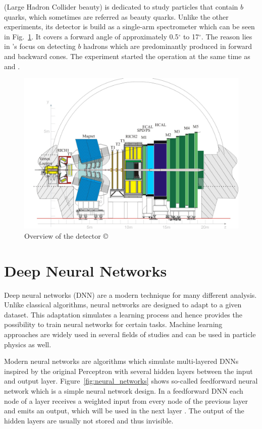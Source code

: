 \documentclass[bachelor,ngerman,english]{GAUBM}
\begin{document}
\lhcb (Large Hadron Collider beauty) \cite{other:lhcb} is dedicated to study particles that contain $b$ quarks, which sometimes are referred as beauty quarks. Unlike the other experiments, its detector is build as a single-arm spectrometer which can be seen in Fig.~\ref{fig:detector_lhcb}. It covers a forward angle of approximately 0.5$^\circ$ to 17$^\circ$. The reason lies in \lhcb's focus on detecting $b$ hadrons which are predominantly produced in forward and backward cones. The \lhcb experiment started the operation at the same time as \atlas and \cms.

\begin{figure}[t]
    \centering
    \includegraphics[width=.8\textwidth]{figures/lhc/detector_lhcb.jpg}
    \caption{Overview of the \lhcb detector \copyright{\cern}}
    \label{fig:detector_lhcb}
\end{figure}


\chapter{Deep Neural Networks}
\label{ch:neural_networks}
Deep neural networks (DNN) are a modern technique for many different analysis. Unlike classical algorithms, neural networks are designed to adapt to a given dataset. This adaptation simulates a learning process and hence provides the possibility to train neural networks for certain tasks. Machine learning approaches are widely used in several fields of studies and can be used in particle physics as well. 

Modern neural networks are algorithms which simulate multi-layered DNNs inspired by the original Perceptron \cite{nn:perceptron} with several hidden layers between the input and output layer. Figure~\ref{fig:neural_networks} shows so-called feedforward neural network which is a simple neural network design. In a feedforward DNN each node of a layer receives a weighted input from every node of the previous layer and emits an output, which will be used in the next layer \cite{nn:node_calculation}. The output of the hidden layers are usually not stored and thus invisible.
\end{document}
